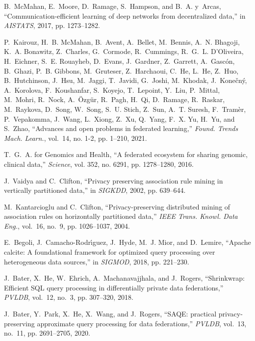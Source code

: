 \documentclass[11pt]{article}
\begin{document}
\begin{thebibliography}{10}
B.~McMahan, E.~Moore, D.~Ramage, S.~Hampson, and B.~A. y~Arcas,
  ``Communication-efficient learning of deep networks from decentralized
  data,'' in \emph{{AISTATS}}, 2017, pp. 1273--1282.

P.~Kairouz, H.~B. McMahan, B.~Avent, A.~Bellet, M.~Bennis, A.~N. Bhagoji, K.~A.
  Bonawitz, Z.~Charles, G.~Cormode, R.~Cummings, R.~G.~L. D'Oliveira,
  H.~Eichner, S.~E. Rouayheb, D.~Evans, J.~Gardner, Z.~Garrett,
  A.~Gasc{\'{o}}n, B.~Ghazi, P.~B. Gibbons, M.~Gruteser, Z.~Harchaoui, C.~He,
  L.~He, Z.~Huo, B.~Hutchinson, J.~Hsu, M.~Jaggi, T.~Javidi, G.~Joshi,
  M.~Khodak, J.~Kone{\v{c}}n{\'y}, A.~Korolova, F.~Koushanfar, S.~Koyejo,
  T.~Lepoint, Y.~Liu, P.~Mittal, M.~Mohri, R.~Nock, A.~{\"{O}}zg{\"{u}}r,
  R.~Pagh, H.~Qi, D.~Ramage, R.~Raskar, M.~Raykova, D.~Song, W.~Song, S.~U.
  Stich, Z.~Sun, A.~T. Suresh, F.~Tram{\`{e}}r, P.~Vepakomma, J.~Wang,
  L.~Xiong, Z.~Xu, Q.~Yang, F.~X. Yu, H.~Yu, and S.~Zhao, ``Advances and open
  problems in federated learning,'' \emph{Found. Trends Mach. Learn.}, vol.~14,
  no. 1-2, pp. 1--210, 2021.

T.~G.~A. for Genomics and Health, ``A federated ecosystem for sharing genomic,
  clinical data,'' \emph{Science}, vol. 352, no. 6291, pp. 1278--1280, 2016.

J.~Vaidya and C.~Clifton, ``Privacy preserving association rule mining in
  vertically partitioned data,'' in \emph{{SIGKDD}}, 2002, pp. 639--644.

M.~Kantarcioglu and C.~Clifton, ``Privacy-preserving distributed mining of
  association rules on horizontally partitioned data,'' \emph{{IEEE} Trans.
  Knowl. Data Eng.}, vol.~16, no.~9, pp. 1026--1037, 2004.

E.~Begoli, J.~Camacho{-}Rodr{\'{\i}}guez, J.~Hyde, M.~J. Mior, and D.~Lemire,
  ``Apache {c}alcite: {A} foundational framework for optimized query processing
  over heterogeneous data sources,'' in \emph{{SIGMOD}}, 2018, pp. 221--230.

J.~Bater, X.~He, W.~Ehrich, A.~Machanavajjhala, and J.~Rogers, ``Shrinkwrap:
  Efficient {SQL} query processing in differentially private data
  federations,'' \emph{{PVLDB}}, vol.~12, no.~3, pp. 307--320, 2018.

J.~Bater, Y.~Park, X.~He, X.~Wang, and J.~Rogers, ``{SAQE:} practical
  privacy-preserving approximate query processing for data federations,''
  \emph{{PVLDB}}, vol.~13, no.~11, pp. 2691--2705, 2020.


\end{thebibliography}
\end{document}
